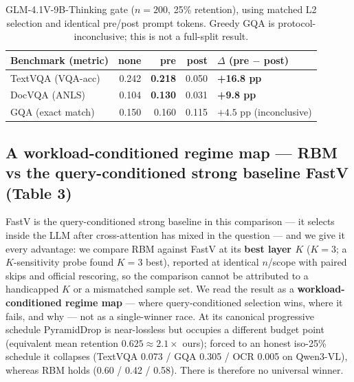 \documentclass[sigconf,review,anonymous]{acmart}
\begin{document}
\begin{table}[t]
  \centering
  \small
  \caption{GLM-4.1V-9B-Thinking gate ($n=200$, 25\% retention), using matched
    L2 selection and identical pre/post prompt tokens. Greedy GQA is
    protocol-inconclusive; this is not a full-split result.}
  \label{tab:glm}
  \begin{tabular}{@{}l r r r l@{}}
    \toprule
    Benchmark (metric) & none & pre & post & $\Delta$ (pre $-$ post) \\
    \midrule
    TextVQA (VQA-acc) & 0.242 & \textbf{0.218} & 0.050 & \textbf{+16.8 pp} \\
    DocVQA (ANLS)     & 0.104 & \textbf{0.130} & 0.031 & \textbf{+9.8 pp} \\
    GQA (exact match) & 0.150 & 0.160 & 0.115 & $+4.5$ pp (inconclusive) \\
    \bottomrule
  \end{tabular}
\end{table}

\subsection{A workload-conditioned regime map --- RBM vs the query-conditioned strong baseline FastV (Table 3)}\label{sec:fastv}

FastV is the query-conditioned strong baseline in this comparison --- it
selects inside the LLM after cross-attention has mixed in the question --- and
we give it every advantage: we compare RBM against FastV at its \textbf{best
layer $K$} ($K = 3$; a $K$-sensitivity probe found $K = 3$ best), reported at
identical $n$/scope with paired skips and official rescoring, so the comparison
cannot be attributed to a handicapped $K$ or a mismatched sample set. We read
the result as a \textbf{workload-conditioned regime map} --- where
query-conditioned selection wins, where it fails, and why --- not as a
single-winner race. At its canonical progressive schedule
PyramidDrop is near-lossless but occupies a different budget point (equivalent
mean retention $0.625 \approx 2.1\times$ ours); forced to an honest iso-25\%
schedule it collapses (TextVQA 0.073 / GQA 0.305 / OCR 0.005 on Qwen3-VL),
whereas RBM holds (0.60 / 0.42 / 0.58). There is therefore no universal winner.
\end{document}
